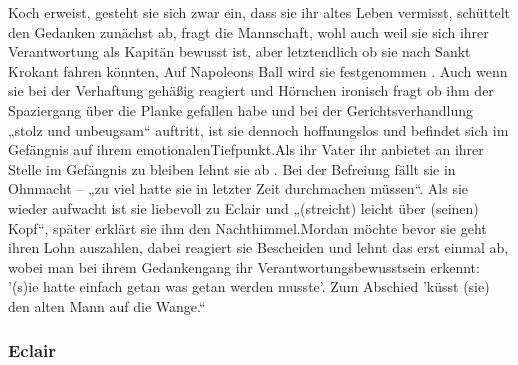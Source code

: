 {Koch erweist,\cite[S.218ff]{pir} gesteht sie sich zwar ein, dass sie ihr altes Leben vermisst, schüttelt den Gedanken 
zunächst ab,\cite[S.521f]{pir} fragt die Mannschaft, wohl auch weil sie sich ihrer Verantwortung als Kapitän bewusst ist, 
aber letztendlich ob sie nach Sankt Krokant fahren könnten,\cite[S.529]{pir} Auf Napoleons Ball wird sie festgenommen \cite[S.551]{pir}. 
Auch wenn sie bei der Verhaftung gehäßig reagiert und Hörnchen ironisch fragt ob ihm der Spaziergang über die Planke gefallen habe \cite[S.522]{pir} und bei der Gerichtsverhandlung „stolz und 
unbeugsam“ \cite[S.573]{pir} auftritt, ist sie dennoch hoffnungslos und befindet sich im Gefängnis auf ihrem emotionalenTiefpunkt.\cite[S.561]{pir}Als ihr Vater ihr anbietet an ihrer Stelle im Gefängnis zu bleiben lehnt sie ab \cite[S.562]{pir}. Bei der Befreiung fällt sie in Ohnmacht – „zu viel hatte sie in letzter Zeit durchmachen müssen“\cite[S.617]{pir}. Als sie wieder aufwacht ist sie liebevoll zu Eclair und „(streicht) leicht über (seinen) Kopf“, später erklärt sie ihm den Nachthimmel.\cite[S.631]{pir}Mordan möchte bevor sie geht ihren Lohn auszahlen, dabei reagiert sie Bescheiden und lehnt das erst einmal ab, wobei man bei ihrem Gedankengang ihr Verantwortungsbewusstsein  erkennt: \cite[S.638]{pir} '(s)ie hatte einfach getan was getan werden musste'.\cite[S.638]{pir} Zum Abschied 'küsst (sie) den alten Mann auf die Wange.“\cite[S.638]{pir}




\subsubsection{Eclair}

}

